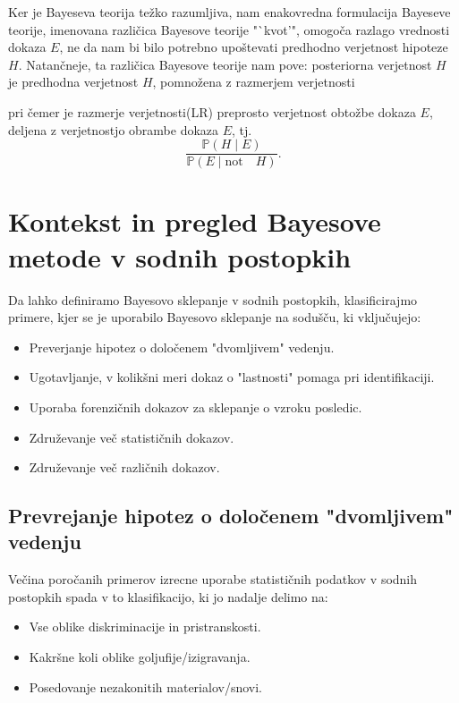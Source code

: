 \documentclass[a4paper,12pt]{article}
\begin{document}
Ker je Bayeseva teorija težko razumljiva, nam enakovredna formulacija Bayeseve teorije, imenovana različica Bayesove teorije "`kvot'", 
omogoča razlago vrednosti dokaza $E$, ne da nam bi bilo potrebno upoštevati predhodno verjetnost hipoteze $H$. Natančneje, ta različica 
Bayesove teorije nam pove:\vspace{5mm}
posteriorna verjetnost $H$ je predhodna verjetnost $H$, pomnožena z razmerjem verjetnosti  
\vspace{5mm}

pri čemer je razmerje verjetnosti(LR) preprosto verjetnost obtožbe dokaza $E$, deljena z verjetnostjo obrambe dokaza $E$, tj.
\[\frac{\mathbb{P}(H \mid E)}{\mathbb{P}(E \mid \text{not} \quad H)}.\]

\section{Kontekst in pregled Bayesove metode v sodnih postopkih}
Da lahko definiramo Bayesovo sklepanje v sodnih postopkih, klasificirajmo primere, kjer se je uporabilo Bayesovo sklepanje na sodušču, 
ki vključujejo:
\begin{itemize}
    \item Preverjanje hipotez o določenem "dvomljivem" vedenju.
    \item Ugotavljanje, v kolikšni meri dokaz o "lastnosti" pomaga pri identifikaciji.
    \item Uporaba forenzičnih dokazov za sklepanje o vzroku posledic.
    \item Združevanje več statističnih dokazov.
    \item Združevanje več različnih dokazov.
\end{itemize}

\subsection{Prevrejanje hipotez o določenem "dvomljivem" vedenju}
Večina poročanih primerov izrecne uporabe statističnih podatkov v sodnih postopkih spada v to klasifikacijo, ki jo nadalje delimo na:
\begin{itemize}
    \item Vse oblike diskriminacije in pristranskosti.
    \item Kakršne koli oblike goljufije/izigravanja.
    \item Posedovanje nezakonitih materialov/snovi.
\end{itemize}
\end{document}
